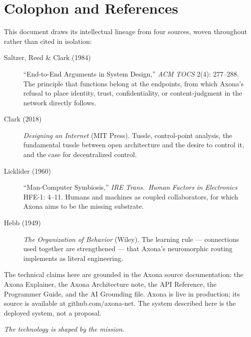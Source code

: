 \documentclass[nobib,justified]{tufte-handout}
\begin{document}
\section{Colophon and References}

This document draws its intellectual lineage from four sources, woven throughout
rather than cited in isolation:

\begin{description}
\item[Saltzer, Reed \& Clark (1984)] ``End-to-End Arguments in System Design,''
\emph{ACM TOCS} 2(4): 277--288. The principle that functions belong at the
endpoints, from which Axona's refusal to place identity, trust, confidentiality, or
content-judgment in the network directly follows.
\item[Clark (2018)] \emph{Designing an Internet} (MIT Press). Tussle,
control-point analysis, the fundamental tussle between open architecture and the
desire to control it, and the case for decentralized control.
\item[Licklider (1960)] ``Man-Computer Symbiosis,'' \emph{IRE Trans.\ Human
Factors in Electronics} HFE-1: 4--11. Humans and machines as coupled
collaborators, for which Axona aims to be the missing substrate.
\item[Hebb (1949)] \emph{The Organization of Behavior} (Wiley). The learning rule
--- connections used together are strengthened --- that Axona's neuromorphic
routing implements as literal engineering.
\end{description}

The technical claims here are grounded in the Axona source documentation: the
Axona Explainer, the Axona Architecture note, the API Reference, the Programmer
Guide, and the AI Grounding file. Axona is live in production; its source is available at
github.com/axona-net. The system described here is the
deployed system, not a proposal.

\vspace{1.5em}
\begin{center}\itshape The technology is shaped by the mission.\end{center}
\end{document}
